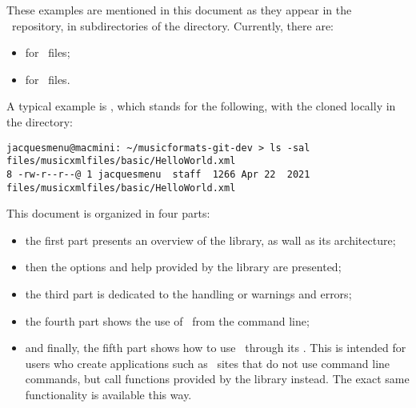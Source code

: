 These examples are mentioned in this document as they appear in the \mf\ repository, in subdirectories of the  directory. Currently, there are:
\begin{itemize}
\item {} for \mxml\ files;
\item {} for \msdlLang\ files.
\end{itemize}

A typical example is , which stands for the following, with the  cloned locally in the  directory:
\begin{lstlisting}[language=Terminal]
jacquesmenu@macmini: ~/musicformats-git-dev > ls -sal files/musicxmlfiles/basic/HelloWorld.xml
8 -rw-r--r--@ 1 jacquesmenu  staff  1266 Apr 22  2021 files/musicxmlfiles/basic/HelloWorld.xml
\end{lstlisting}

This document is organized in four parts:
\begin{itemize}
\item the first part presents an overview of the library, as wall as its architecture;
\item then the options and help provided by the library are presented;
\item the third part is dedicated to the handling or warnings and errors;
\item the fourth part shows the use of \mf\ from the command line;
\item and finally, the fifth part shows how to use \mf\ through its \API. This is intended for users who create applications such as \Web\ sites that do not use command line commands, but call functions provided by the library instead. The exact same functionality is available this way.
\end{itemize}


